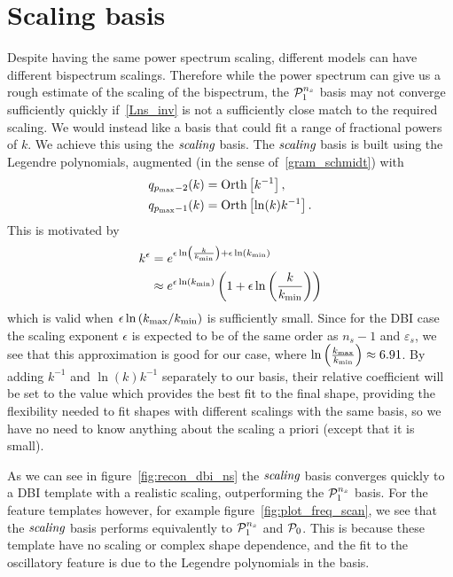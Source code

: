 \section{Scaling basis}
    Despite having the same power spectrum scaling,
    different models can have different bispectrum scalings.
    Therefore while the power spectrum can give us a
    rough estimate of the scaling of the bispectrum,
    the $\mathcal{P}^{n_s}_1$ basis may not converge sufficiently quickly if~\eqref{Lns_inv}
    is not a sufficiently close match to the required scaling.
    We would instead like a basis that could fit
    a range of fractional powers of $k$.
    We achieve this using the $\textit{scaling}$ basis.
    The $\textit{scaling}$ basis is built using the Legendre polynomials,
    augmented (in the sense of~\eqref{gram_schmidt})
    with
    \begin{align}\label{scaling_basis_definition}
        q_{p_\text{max}-2}(k) &= \text{Orth}\left[{k^{-1}}\right],\\
        q_{p_\text{max}-1}(k) &= \text{Orth}\left[{\ln(k)k^{-1}}\right].
    \end{align}
    This is motivated by
    \begin{align}
        k^\epsilon &= e^{\epsilon\ln\left(\frac{k}{{k_\text{min}}}\right)+\epsilon\ln({k_\text{min}})}\\
                   &\approx e^{\epsilon\ln\left({k_\text{min}}\right)}
                      \left(1+\epsilon\ln\left(\frac{k}{{k_\text{min}}}\right)\right)
    \end{align}
    which is valid when $\epsilon\ln\left({k_\text{max}}/{k_\text{min}}\right)$ is
    sufficiently small.
    Since for the DBI case the scaling exponent $\epsilon$ is expected to be of the
    same order as $n_s-1$ and $\varepsilon_s$, we see that this
    approximation is good for our case,
    where $\ln\left(\frac{{k_\text{max}}}{{k_\text{min}}}\right)\approx6.91$.
    By adding $k^{-1}$ and $\ln(k)k^{-1}$ separately to our
    basis, their relative coefficient will be set to the value
    which provides the best fit to the final shape,
    providing the flexibility needed to fit shapes with different
    scalings with the same basis, so we have no need to know anything
    about the scaling a priori (except that it is small).

    As we can see in figure~\ref{fig:recon_dbi_ns} the $\textit{scaling}$ basis
    converges quickly to a DBI template with a realistic scaling, outperforming
    the $\mathcal{P}^{n_s}_1$ basis. For the feature templates however,
    for example figure~\ref{fig:plot_freq_scan},
    we see that the $\textit{scaling}$ basis performs equivalently to $\mathcal{P}^{n_s}_1$
    and $\mathcal{P}_0$.
    This is because these template have no scaling or complex shape dependence,
    and the fit to the oscillatory feature is due to the Legendre polynomials
    in the basis.

